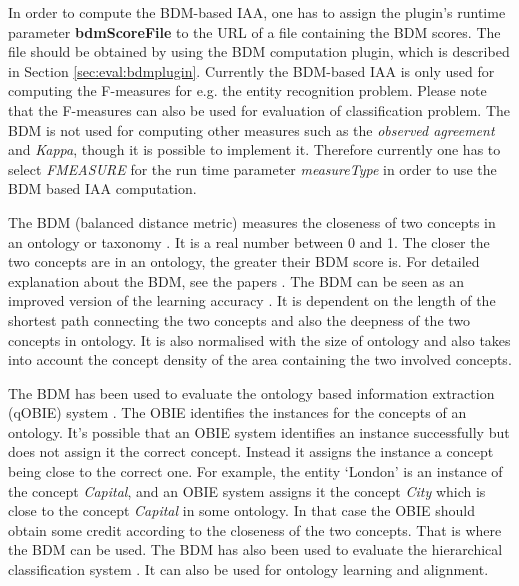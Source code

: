In order to compute the BDM-based IAA, one has to assign the plugin's
runtime parameter {\bf bdmScoreFile} to the URL of a file containing
the BDM scores.  The file should be obtained by using the BDM
computation plugin, which is described in
Section \ref{sec:eval:bdmplugin}. Currently the BDM-based IAA is only
used for computing the F-measures for e.g. the entity recognition
problem. Please note that the F-measures can also be used for
evaluation of classification problem.  The BDM is not used for
computing other measures such as the {\em observed agreement} and {\em
Kappa}, though it is possible to implement it.  Therefore currently
one has to select {\em FMEASURE} for the run time parameter {\em
measureType} in order to use the BDM based IAA computation.



The BDM (balanced distance metric) measures the closeness of two
concepts in an ontology or taxonomy \cite{Maynard05a,Maynard06a}. It
is a real number between 0 and 1. The closer the two concepts are in
an ontology, the greater their BDM score is.  For detailed explanation
about the BDM, see the papers \cite{Maynard05a,Maynard06a}.  The BDM
can be seen as an improved version of the learning
accuracy \cite{Cim03b}.  It is dependent on the length of the shortest
path connecting the two concepts and also the deepness of the two
concepts in ontology. It is also normalised with the size of ontology
and also takes into account the concept density of the area containing
the two involved concepts.

The BDM has been used to evaluate the ontology based information
extraction (qOBIE) system \cite{Maynard06a}. The OBIE identifies the
instances for the concepts of an ontology. It's possible that an OBIE
system identifies an instance successfully but does not assign it the
correct concept. Instead it assigns the instance a concept being close
to the correct one.  For example, the entity `London' is an instance
of the concept {\em Capital}, and an OBIE system assigns it the
concept {\em City} which is close to the concept {\em Capital} in some
ontology.  In that case the OBIE should obtain some credit according
to the closeness of the two concepts.  That is where the BDM can be
used. The BDM has also been used to evaluate the hierarchical
classification system \cite{Yaoyong07a}. It can also be used for
ontology learning and alignment.

